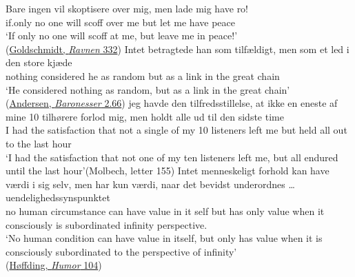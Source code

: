 \ex 
 \gll Bare ingen vil skoptisere over mig, men lade mig have ro!\\
 if.only {no one} will scoff over me but let me have peace\\
\glt `If only no one will scoff at me, but leave me in peace!'\\\hfill(\href{https://archive.org/details/ravnenfortlling00goldgoog/page/332/mode/2up?q=%22mig+have+ro%22&view=theater}{Goldschmidt, \textit{Ravnen} 332}) %
\ex
 \gll Intet betragtede han som tilfældigt, men som et led i den store kjæde\\
 nothing considered he as random but as a link in the great chain\\
\glt `He considered nothing as random, but as a link in the great chain'\\\hfill(\href{https://tekster.kb.dk/text/adl-texts-andersen02val-root#idm140563624535424}{Andersen, \textit{Baronesser} 2.66})
\ex 
 \gll jeg havde den tilfredsstillelse, at ikke en eneste af mine 10 tilhørere forlod mig, men holdt alle ud til den sidste time\\
 I had the satisfaction that not a single of my 10 listeners left me but held all out to the last hour\\
\glt `I had the satisfaction that not one of my ten listeners left me, but all endured until the last hour'\hfill(Molbech, letter 155)
\ex
 \gll Intet menneskeligt forhold kan have værdi i sig selv, men har kun værdi, naar det bevidst underordnes {\dots} uendelighedssynspunktet\\
 no human circumstance can have value in it self but has only value when it consciously {is subordinated} {} {infinity perspective.\DEF}\\
\glt `No human condition can have value in itself, but only has value when it is consciously subordinated to the perspective of infinity'\\\hfill(\href{https://archive.org/details/111408025488-bw_202406/page/104/mode/2up?q=%22Intet+menneskeligt+Forhold+kan+have+V%C3%A6rdi+i+sig+selv%2C+men+har+kun+V%C3%A6rdi%2C+naar+det+bevidst+underordnes+og+omdannes+ud+fra%22&view=theater}{Høffding, \textit{Humor} 104})
